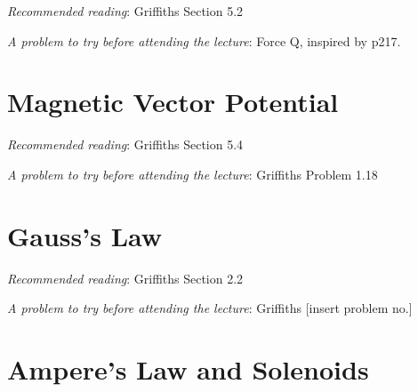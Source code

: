 \documentclass[
  letterpaper,
  DIV=11,
  numbers=noendperiod]{scrreprt}
\begin{document}
\newcommand{\l}{\mathrm{\mathbf{l}}}
\newcommand{\E}{\mathrm{\mathbf{E}}}
\newcommand{\F}{\mathrm{\mathbf{F}}}
\newcommand{\r}{\mathrm{\mathbf{r}}}

\newcommand{\x}{\mathrm{\mathbf{x}}}
\newcommand{\y}{\mathrm{\mathbf{y}}}
\newcommand{\z}{\mathrm{\mathbf{z}}}

\emph{Recommended reading}: Griffiths Section 5.2

\emph{A problem to try before attending the lecture}: Force Q, inspired
by p217.


\chapter{Magnetic Vector Potential}\label{magnetic-vector-potential}

\newcommand{\l}{\mathrm{\mathbf{l}}}
\newcommand{\E}{\mathrm{\mathbf{E}}}
\newcommand{\F}{\mathrm{\mathbf{F}}}
\newcommand{\r}{\mathrm{\mathbf{r}}}

\newcommand{\x}{\mathrm{\mathbf{x}}}
\newcommand{\y}{\mathrm{\mathbf{y}}}
\newcommand{\z}{\mathrm{\mathbf{z}}}

\emph{Recommended reading}: Griffiths Section 5.4

\emph{A problem to try before attending the lecture}: Griffiths Problem
1.18


\chapter{Gauss's Law}\label{gausss-law}

\newcommand{\l}{\mathrm{\mathbf{l}}}
\newcommand{\E}{\mathrm{\mathbf{E}}}
\newcommand{\F}{\mathrm{\mathbf{F}}}
\newcommand{\r}{\mathrm{\mathbf{r}}}

\newcommand{\x}{\mathrm{\mathbf{x}}}
\newcommand{\y}{\mathrm{\mathbf{y}}}
\newcommand{\z}{\mathrm{\mathbf{z}}}

\emph{Recommended reading}: Griffiths Section 2.2

\emph{A problem to try before attending the lecture}: Griffiths
{[}insert problem no.{]}


\chapter{Ampere's Law and Solenoids}\label{amperes-law-and-solenoids}
\end{document}
